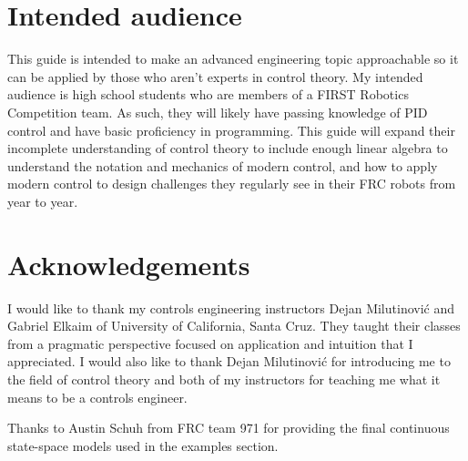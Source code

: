 \section*{Intended audience}

This guide is intended to make an advanced engineering topic approachable so it
can be applied by those who aren't experts in control theory. My intended
audience is high school students who are members of a FIRST Robotics Competition
team. As such, they will likely have passing knowledge of PID control and have
basic proficiency in programming. This guide will expand their incomplete
understanding of control theory to include enough linear algebra to understand
the notation and mechanics of modern control, and how to apply modern control to
design challenges they regularly see in their FRC robots from year to year.

\section*{Acknowledgements}

I would like to thank my controls engineering instructors Dejan Milutinovi\'c
and Gabriel Elkaim of University of California, Santa Cruz. They taught their
classes from a pragmatic perspective focused on application and intuition that I
appreciated. I would also like to thank Dejan Milutinovi\'c for introducing me
to the field of control theory and both of my instructors for teaching me what
it means to be a controls engineer.

Thanks to Austin Schuh from FRC team 971 for providing the final continuous
state-space models used in the examples section.
